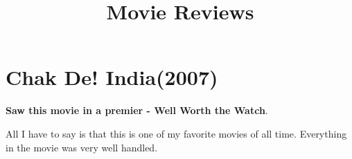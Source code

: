 \documentclass[11pt]{article}
\title{\textbf{Movie Reviews}}
\author{}
\date{}
\begin{document}
\maketitle
\section*{Chak De! India(2007)}
\textbf{Saw this movie in a premier - Well Worth the Watch}.

All I have to say is that this is one of my favorite movies of all time. Everything in the movie was very well handled.
\end{document}
